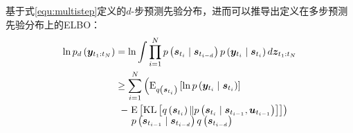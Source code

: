 基于式\eqref{equ:multistep}定义的$d$-步预测先验分布，进而可以推导出定义在多步预测先验分布上的ELBO：
\begin{equation}
\begin{aligned} \ln p_d\left(\boldsymbol{y}_{t_{1}: t_{N}}\right)&=\ln \int \prod_{i=1}^{N} p\left(\boldsymbol{s}_{t_{i}} \mid \boldsymbol{s}_{t_{i-d}} \right) p\left(\boldsymbol{y}_{t_{i}} \mid \boldsymbol{s}_{t_{i}}\right) d \boldsymbol{z}_{t_{1}: t_{N}} \\ 
& \geq\sum_{i=1}^{N}\left(\mathrm{E}_{q\left(\boldsymbol{s}_{t_{i}}\right)}\left[\ln p\left(\boldsymbol{y}_{t_{i}} \mid \boldsymbol{s}_{t_{i}}\right)\right]\right.\\
&\hspace{-1ex}\quad\begin{aligned}
-&\left.\mathrm{E}\left[\operatorname{KL}\left[q\left(\boldsymbol{s}_{t_{i}}\right)\| p\left(\boldsymbol{s}_{t_{i}} \mid \boldsymbol{s}_{t_{i-1}},\boldsymbol{u}_{t_{i-1}}\right)\right]\right]\right)\\[-5pt]
&\ \tiny{p\left(\boldsymbol{s}_{t_{i-1}} \mid \boldsymbol{s}_{t_{i-d}}\right){q\left(\boldsymbol{s}_{t_{i-d}}\right)}}
\end{aligned}
\end{aligned}
\label{equ:loss_multi}
\end{equation}

